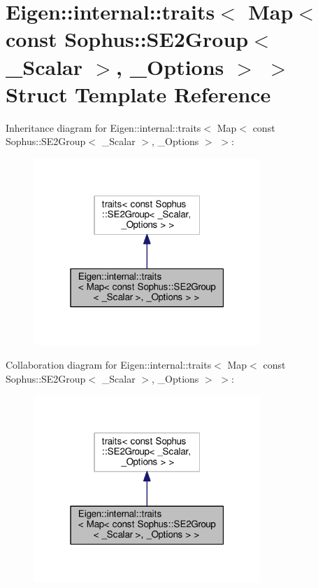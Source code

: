 \hypertarget{struct_eigen_1_1internal_1_1traits_3_01_map_3_01const_01_sophus_1_1_s_e2_group_3_01___scalar_01_4_00_01___options_01_4_01_4}{}\section{Eigen\+:\+:internal\+:\+:traits$<$ Map$<$ const Sophus\+:\+:S\+E2\+Group$<$ \+\_\+\+Scalar $>$, \+\_\+\+Options $>$ $>$ Struct Template Reference}
\label{struct_eigen_1_1internal_1_1traits_3_01_map_3_01const_01_sophus_1_1_s_e2_group_3_01___scalar_01_4_00_01___options_01_4_01_4}


Inheritance diagram for Eigen\+:\+:internal\+:\+:traits$<$ Map$<$ const Sophus\+:\+:S\+E2\+Group$<$ \+\_\+\+Scalar $>$, \+\_\+\+Options $>$ $>$\+:
\nopagebreak
\begin{figure}[H]
\begin{center}
\leavevmode
\includegraphics[width=244pt]{struct_eigen_1_1internal_1_1traits_3_01_map_3_01const_01_sophus_1_1_s_e2_group_3_01___scalar_01_9703b4c525ab7a8a6cea3c2724270eec}
\end{center}
\end{figure}


Collaboration diagram for Eigen\+:\+:internal\+:\+:traits$<$ Map$<$ const Sophus\+:\+:S\+E2\+Group$<$ \+\_\+\+Scalar $>$, \+\_\+\+Options $>$ $>$\+:
\nopagebreak
\begin{figure}[H]
\begin{center}
\leavevmode
\includegraphics[width=244pt]{struct_eigen_1_1internal_1_1traits_3_01_map_3_01const_01_sophus_1_1_s_e2_group_3_01___scalar_01_ebb9a1e6d28965f31297e7018f0375a3}
\end{center}
\end{figure}
